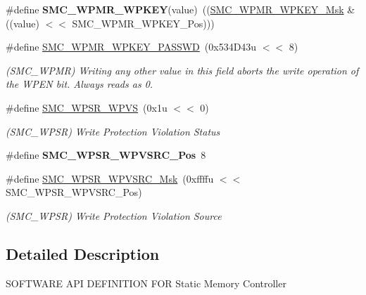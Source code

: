 \begin{DoxyCompactItemize}
\mbox{\label{group__SAME70__SMC_gad1c580c59fc56bf766d0ef3484f44f44}} 
\#define {\bfseries S\+M\+C\+\_\+\+W\+P\+M\+R\+\_\+\+W\+P\+K\+EY}(value)~((\mbox{\hyperlink{group__SAMV71__SMC_ga588e57ce3327f3036091fae414adc054}{S\+M\+C\+\_\+\+W\+P\+M\+R\+\_\+\+W\+P\+K\+E\+Y\+\_\+\+Msk}} \& ((value) $<$$<$ S\+M\+C\+\_\+\+W\+P\+M\+R\+\_\+\+W\+P\+K\+E\+Y\+\_\+\+Pos)))
\item 
\mbox{\label{group__SAME70__SMC_ga704d5be56badbe9b71f14e9604fdabc7}} 
\#define \mbox{\hyperlink{group__SAME70__SMC_ga704d5be56badbe9b71f14e9604fdabc7}{S\+M\+C\+\_\+\+W\+P\+M\+R\+\_\+\+W\+P\+K\+E\+Y\+\_\+\+P\+A\+S\+S\+WD}}~(0x534\+D43u $<$$<$ 8)
\begin{DoxyCompactList}\small\item\em (S\+M\+C\+\_\+\+W\+P\+MR) Writing any other value in this field aborts the write operation of the W\+P\+EN bit. Always reads as 0. \end{DoxyCompactList}\item 
\mbox{\label{group__SAME70__SMC_ga03b1d62fbf36357cc008315104a140c4}} 
\#define \mbox{\hyperlink{group__SAME70__SMC_ga03b1d62fbf36357cc008315104a140c4}{S\+M\+C\+\_\+\+W\+P\+S\+R\+\_\+\+W\+P\+VS}}~(0x1u $<$$<$ 0)
\begin{DoxyCompactList}\small\item\em (S\+M\+C\+\_\+\+W\+P\+SR) Write Protection Violation Status \end{DoxyCompactList}\item 
\mbox{\label{group__SAME70__SMC_ga82f6511278bd924f5dece5a562e8ec26}} 
\#define {\bfseries S\+M\+C\+\_\+\+W\+P\+S\+R\+\_\+\+W\+P\+V\+S\+R\+C\+\_\+\+Pos}~8
\item 
\mbox{\label{group__SAME70__SMC_ga48efdac8353b5b525f55005c016e8548}} 
\#define \mbox{\hyperlink{group__SAME70__SMC_ga48efdac8353b5b525f55005c016e8548}{S\+M\+C\+\_\+\+W\+P\+S\+R\+\_\+\+W\+P\+V\+S\+R\+C\+\_\+\+Msk}}~(0xffffu $<$$<$ S\+M\+C\+\_\+\+W\+P\+S\+R\+\_\+\+W\+P\+V\+S\+R\+C\+\_\+\+Pos)
\begin{DoxyCompactList}\small\item\em (S\+M\+C\+\_\+\+W\+P\+SR) Write Protection Violation Source \end{DoxyCompactList}\end{DoxyCompactItemize}


\subsection{Detailed Description}
S\+O\+F\+T\+W\+A\+RE A\+PI D\+E\+F\+I\+N\+I\+T\+I\+ON F\+OR Static Memory Controller 